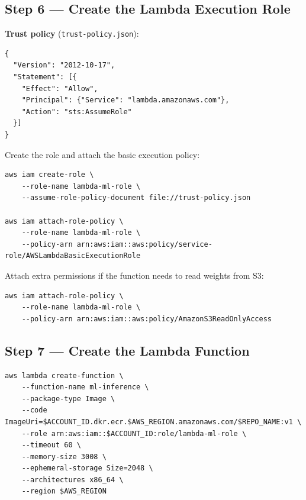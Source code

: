 \documentclass[11pt,a4paper]{article}
\begin{document}
\subsection{Step 6 --- Create the Lambda Execution Role}

\textbf{Trust policy} (\texttt{trust-policy.json}):

\begin{lstlisting}[style=jsoncode]
{
  "Version": "2012-10-17",
  "Statement": [{
    "Effect": "Allow",
    "Principal": {"Service": "lambda.amazonaws.com"},
    "Action": "sts:AssumeRole"
  }]
}
\end{lstlisting}

Create the role and attach the basic execution policy:

\begin{lstlisting}[style=bashcode]
aws iam create-role \
    --role-name lambda-ml-role \
    --assume-role-policy-document file://trust-policy.json

aws iam attach-role-policy \
    --role-name lambda-ml-role \
    --policy-arn arn:aws:iam::aws:policy/service-role/AWSLambdaBasicExecutionRole
\end{lstlisting}

Attach extra permissions if the function needs to read weights from S3:

\begin{lstlisting}[style=bashcode]
aws iam attach-role-policy \
    --role-name lambda-ml-role \
    --policy-arn arn:aws:iam::aws:policy/AmazonS3ReadOnlyAccess
\end{lstlisting}

\subsection{Step 7 --- Create the Lambda Function}

\begin{lstlisting}[style=bashcode]
aws lambda create-function \
    --function-name ml-inference \
    --package-type Image \
    --code ImageUri=$ACCOUNT_ID.dkr.ecr.$AWS_REGION.amazonaws.com/$REPO_NAME:v1 \
    --role arn:aws:iam::$ACCOUNT_ID:role/lambda-ml-role \
    --timeout 60 \
    --memory-size 3008 \
    --ephemeral-storage Size=2048 \
    --architectures x86_64 \
    --region $AWS_REGION
\end{lstlisting}
\end{document}
